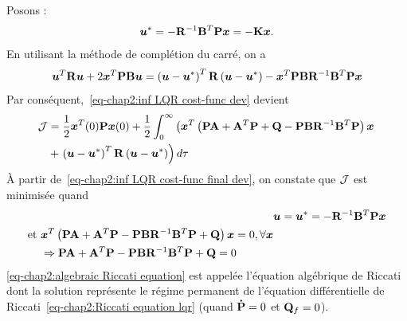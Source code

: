 Posons : 
\begin{equation}\label{eq-chap2:inf LQR command}
	\bm{u}^* = -\mathbf{R}^{-1}\mathbf{B}^T\mathbf{P}\bm{x} = -\mathbf{K}\bm{x}.
\end{equation}
En utilisant la méthode de complétion du carré, on a 
\begin{equation}
	\bm{u}^T\mathbf{R}\bm{u}+2\bm{x}^T\mathbf{P}\mathbf{B}\bm{u} = \left(\bm{u}-\bm{u}^*\right)^T\mathbf{R}\left(\bm{u}-\bm{u}^*\right) - \bm{x}^T\mathbf{P}\mathbf{B}\mathbf{R}^{-1}\mathbf{B}^T\mathbf{P}\bm{x}
\end{equation}
Par conséquent,~\eqref{eq-chap2:inf LQR cost-func dev} devient  
\begin{align}\label{eq-chap2:inf LQR cost-func final dev}
	\begin{split}
		{\cal J} &=\frac{1}{2}\bm{x}^T(0)\mathbf{P}\bm{x}(0) +  \frac{1}{2}\int_{0}^{\infty}\left(\bm{x}^T\left(\mathbf{P}\mathbf{A} + \mathbf{A}^T\mathbf{P}+\mathbf{Q}-\mathbf{P}\mathbf{B}\mathbf{R}^{-1}\mathbf{B}^T\mathbf{P}\right)\bm{x}\right.\\&+
	\left.\left(\bm{u}-\bm{u}^*\right)^T\mathbf{R}\left(\bm{u}-\bm{u}^*\right)\right) d\tau
	\end{split}
\end{align}
À partir de~\eqref{eq-chap2:inf LQR cost-func final dev}, on constate que ${\cal J}$ est minimisée quand
\begin{align}\label{eq-chap2:commande inf LQR}
	&\bm{u}=\bm{u}^*=-\mathbf{R}^{-1}\mathbf{B}^T\mathbf{P}\bm{x}\\
	\begin{split}\label{eq-chap2:algebraic Riccati equation}
		\text{et}~&\bm{x}^T\left(\mathbf{P}\mathbf{A}+\mathbf{A}^T\mathbf{P}-\mathbf{P}\mathbf{B}\mathbf{R}^{-1}\mathbf{B}^T\mathbf{P}+\mathbf{Q}\right)\bm{x}=0,  \forall \bm{x} \\&\Rightarrow \mathbf{P}\mathbf{A}+\mathbf{A}^T\mathbf{P}-\mathbf{P}\mathbf{B}\mathbf{R}^{-1}\mathbf{B}^T\mathbf{P}+\mathbf{Q}=0
	\end{split}
\end{align}
\cref{eq-chap2:algebraic Riccati equation} est appelée l'équation algébrique de Riccati dont la solution représente le régime permanent de l'équation différentielle de Riccati~\eqref{eq-chap2:Riccati equation lqr} (quand $\mathbf{\dot{\mathbf{P}}}=0$ et $\mathbf{Q}_f=0$).
